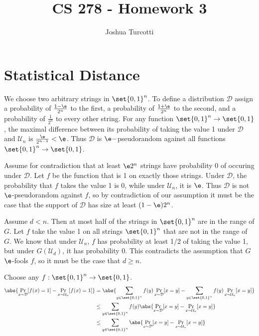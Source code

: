 \documentclass{article}
\title{CS 278 - Homework 3}
\author{Joshua Turcotti}
\begin{document}
\maketitle
\section{Statistical Distance}
\begin{alphalist}
  \renewcommand{\D}{\mathcal{D}}
  \newcommand{\Un}{\mathcal{U}_n}
\item We choose two arbitrary strings in $\set{0, 1}^n$. To define a distribution $\D$ assign a probability of $\frac{1-\e}{2^n}$ to the first, a probability of $\frac{1+\e}{2^n}$ to the second, and a probability of $\frac{1}{2^n}$ to every other string. For any function $\set{0, 1}^n \to \set{0, 1}$, the maximal difference between its probability of taking the value 1 under $\D$ and $\Un$ is $\frac{\e}{2^{n-1}} < \e$. Thus $\D$ is $\e-$pseudorandom against all functions $\set{0, 1}^n \to \set{0, 1}$.
\item Assume for contradiction that at least $\e 2^n$ strings have probability 0 of occuring under $\D$. Let $f$ be the function that is 1 on exactly those strings. Under $\D$, the probability that $f$ takes the value 1 is 0, while under $\Un$, it is $\e$. Thus $\D$ is not $\e$-pseudorandom against $f$, so by contradiction of our assumption it must be the case that the support of $\D$ has size at least $(1 - \e)2^n$.
\item Assume $d < n$. Then at most half of the strings in $\set{0, 1}^n$ are in the range of $G$. Let $f$ take the value 1 on all strings $\set{0, 1}^n$ that are not in the range of $G$. We know that under $\Un$, $f$ has probability at least 1/2 of taking the value 1, but under $G(\mathcal{U}_d)$, it has probability 0. This contradicts the assumption that $G$ $\e$-fools $f$, so it must be the case that $d \ge n$.
\item Choose any $f: \set{0, 1}^n \to \set{0, 1}$.
  \begin{align*}
    \abs{\Pr_{x\sim\D}[f(x) = 1] - \Pr_{x\sim\Un}[f(x) = 1]} &= \abs{\sum_{y \in \set{0, 1}^n} f(y)\Pr_{x\sim\D}[x = y] - \sum_{y \in \set{0, 1}^n} f(y)\Pr_{x\sim\Un}[x = y]} \\
                                                             &\le \sum_{y \in \set{0, 1}^n}f(y)\abs{\Pr_{x\sim\D}[x = y] - \Pr_{x\sim\Un}[x = y]} \\
                                                             &\le\sum_{y \in \set{0, 1}^n}\abs{\Pr_{x\sim\D}[x = y] - \Pr_{x\sim\Un}[x = y]} \\
  \end{align*}
\end{alphalist}
\end{document}
